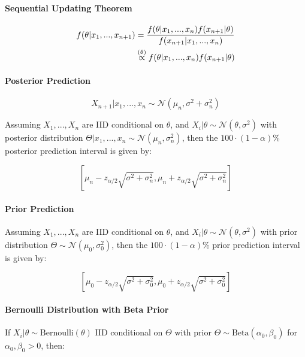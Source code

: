 \documentclass[a4paper]{article}
\begin{document}
            \paragraph{Sequential Updating Theorem}
                \begin{align*}
                    f(\theta | x_1, ..., x_{n+1}) & = \frac{f(\theta | x_1, ...,
                        x_n)f(x_{n+1} | \theta)}{f(x_{n+1} | x_1, ..., x_n)} \\
                    & \stackrel{({\theta})}{\propto} f(\theta | x_1, ..., x_n)f(x_{n+1} |
                        \theta)
                \end{align*}

            \paragraph{Posterior Prediction}
                \[
                    X_{n+1} | x_1, ..., x_n \sim \mathcal{N}(\mu_n, \sigma^2 +
                    \sigma_n^2)
                \]

                Assuming $X_1, ..., X_n$ are IID conditional on $\theta$, and
                $X_i | \theta \sim \mathcal{N}(\theta, \sigma^2)$ with posterior
                distribution $\Theta | x_1, ..., x_n \sim \mathcal{N}(\mu_n,
                \sigma_n^2)$, then the $100 \cdot (1 - \alpha)\%$ posterior
                prediction interval is given by:

                \[
                    \left[\mu_n - z_{\alpha/2} \sqrt{\sigma^2 + \sigma_n^2},
                    \mu_n + z_{\alpha/2} \sqrt{\sigma^2 + \sigma_n^2}\right]
                \]

            \paragraph{Prior Prediction}
                Assuming $X_1, ..., X_n$ are IID conditional on $\theta$, and
                $X_i | \theta \sim \mathcal{N}(\theta, \sigma^2)$ with prior
                distribution $\Theta \sim \mathcal{N}(\mu_0, \sigma_0^2)$, then
                the $100 \cdot (1 - \alpha)\%$ prior prediction interval is
                given by:

                \[
                    \left[\mu_0 - z_{\alpha/2}\sqrt{\sigma^2 + \sigma_0^2},
                    \mu_0 + z_{\alpha/2}\sqrt{\sigma^2 + \sigma_0^2}\right]
                \]

            \paragraph{Bernoulli Distribution with Beta Prior}
                If $X_i | \theta \sim \text{Bernoulli}(\theta)$ IID conditional
                on $\Theta$ with prior $\Theta \sim \text{Beta}(\alpha_0,
                \beta_0)$ for $\alpha_0, \beta_0 > 0$, then:
\end{document}
